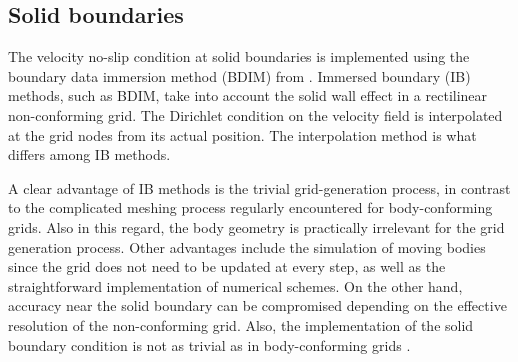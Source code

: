 \documentclass[../main.tex]{subfiles}
\begin{document}
\subsection{Solid boundaries} \label{sec:bdim}

The velocity no-slip condition at solid boundaries is implemented using the boundary data immersion method (BDIM) from \cite{Weymouth2011}.
Immersed boundary (IB) methods, such as BDIM, take into account the solid wall effect in a rectilinear non-conforming grid.
The Dirichlet condition on the velocity field is interpolated at the grid nodes from its actual position.
The interpolation method is what differs among IB methods.

A clear advantage of IB methods is the trivial grid-generation process, in contrast to the complicated meshing process regularly encountered for body-conforming grids.
Also in this regard, the body geometry is practically irrelevant for the grid generation process.
Other advantages include the simulation of moving bodies since the grid does not need to be updated at every step, as well as the straightforward implementation of numerical schemes.
On the other hand, accuracy near the solid boundary can be compromised depending on the effective resolution of the non-conforming grid.
Also, the implementation of the solid boundary condition is not as trivial as in body-conforming grids \citep{Mittal2005}.
\end{document}
